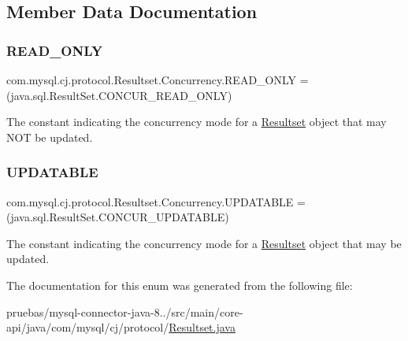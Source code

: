 \subsection{Member Data Documentation}
\mbox{\label{enumcom_1_1mysql_1_1cj_1_1protocol_1_1_resultset_1_1_concurrency_ad95969aa1d11771ceb9081ea8447fc41}} 
\subsubsection{\texorpdfstring{R\+E\+A\+D\+\_\+\+O\+N\+LY}{READ\_ONLY}}
{\footnotesize\ttfamily com.\+mysql.\+cj.\+protocol.\+Resultset.\+Concurrency.\+R\+E\+A\+D\+\_\+\+O\+N\+LY =(java.\+sql.\+Result\+Set.\+C\+O\+N\+C\+U\+R\+\_\+\+R\+E\+A\+D\+\_\+\+O\+N\+LY)}

The constant indicating the concurrency mode for a {\ttfamily \mbox{\hyperlink{interfacecom_1_1mysql_1_1cj_1_1protocol_1_1_resultset}{Resultset}}} object that may N\+OT be updated. \mbox{\label{enumcom_1_1mysql_1_1cj_1_1protocol_1_1_resultset_1_1_concurrency_a1bf39feaaedfbfc0722738fce73d919c}} 
\subsubsection{\texorpdfstring{U\+P\+D\+A\+T\+A\+B\+LE}{UPDATABLE}}
{\footnotesize\ttfamily com.\+mysql.\+cj.\+protocol.\+Resultset.\+Concurrency.\+U\+P\+D\+A\+T\+A\+B\+LE =(java.\+sql.\+Result\+Set.\+C\+O\+N\+C\+U\+R\+\_\+\+U\+P\+D\+A\+T\+A\+B\+LE)}

The constant indicating the concurrency mode for a {\ttfamily \mbox{\hyperlink{interfacecom_1_1mysql_1_1cj_1_1protocol_1_1_resultset}{Resultset}}} object that may be updated. 

The documentation for this enum was generated from the following file\+:\begin{DoxyCompactItemize}
\item 
pruebas/mysql-\/connector-\/java-\/8../src/main/core-\/api/java/com/mysql/cj/protocol/\mbox{\hyperlink{_resultset_8java}{Resultset.\+java}}\end{DoxyCompactItemize}

